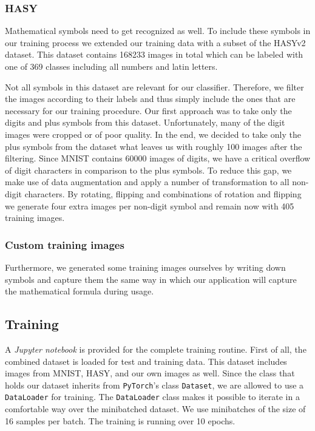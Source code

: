 \documentclass[12pt]{article}
\begin{document}
\begin{itemize}
\begin{itemize}
\begin{itemize}
\begin{itemize}
\begin{itemize}
\begin{itemize}
\begin{itemize}
\begin{itemize}
\begin{itemize}
\begin{itemize}
		\subsubsection{HASY}
			Mathematical symbols need to get recognized as well. To include these symbols in our training process we extended our training data with a subset of the HASYv2\cite{hasy} dataset. This dataset contains 168233 images in total which can be labeled with one of 369 classes including all numbers and latin letters. 
			
			Not all symbols in this dataset are relevant for our classifier. Therefore, we filter the images according to their labels and thus simply include the ones that are necessary for our training procedure. Our first approach was to take only the digits and plus symbols from this dataset. Unfortunately, many of the digit images were cropped or of poor quality. In the end, we decided to take only the plus symbols from the dataset what leaves us with roughly 100 images after the filtering. Since MNIST contains 60000 images of digits, we have a critical overflow of digit characters in comparison to the plus symbols. To reduce this gap, we make use of data augmentation and apply a number of transformation to all non-digit characters. By rotating, flipping and combinations of rotation and flipping we generate four extra images per non-digit symbol and remain now with 405 training images.
			
		\subsubsection{Custom training images}
		Furthermore, we generated some training images ourselves by writing down symbols and capture them the same way in which our application will capture the mathematical formula during usage.
		
	\subsection{Training}
		A \textit{Jupyter notebook} is provided for the complete training routine. First of all, the combined dataset is loaded for test and training data. This dataset includes images from MNIST, HASY, and our own images as well. Since the class that holds our dataset inherits from \texttt{PyTorch}'s class \texttt{Dataset}, we are allowed to use a \texttt{DataLoader} for training. The \texttt{DataLoader} class makes it possible to iterate in a comfortable way over the minibatched dataset. We use minibatches of the size of 16 samples per batch. The training is running over 10 epochs.
		

\end{itemize}
\end{itemize}
\end{itemize}
\end{itemize}
\end{itemize}
\end{itemize}
\end{itemize}
\end{itemize}
\end{itemize}
\end{itemize}
\end{document}

